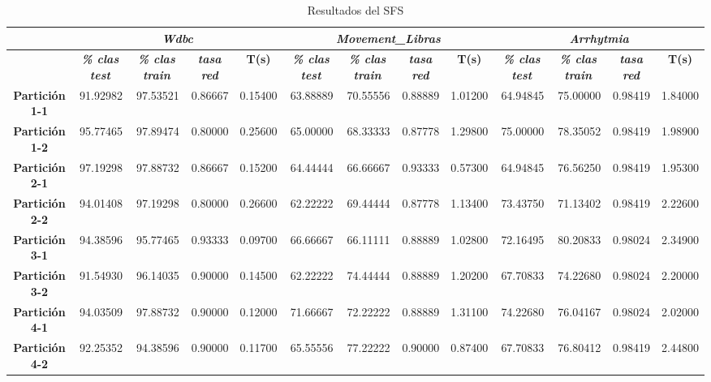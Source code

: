 \documentclass[a4paper,11pt]{article}
\begin{document}
  \begin{table}[H]	
  \caption{Resultados del SFS}
  \begin{adjustbox}{width=1.1\textwidth}
  \begin{tabular}{|c|r|r|r|r|r|r|r|r|r|r|r|r|}
  \hline
  \multicolumn{1}{|l|}{} & \multicolumn{ 4}{c|}{\textbf{\textit{Wdbc}}} & \multicolumn{ 4}{c|}{\textbf{\textit{Movement\_Libras}}} & \multicolumn{ 4}{c|}{\textbf{\textit{Arrhytmia}}} \\ \hline
  \multicolumn{1}{|l|}{} & \multicolumn{1}{c|}{\textbf{\textit{\% clas test}}} & \multicolumn{1}{c|}{\textbf{\textit{\% clas train}}} & \multicolumn{1}{c|}{\textbf{\textit{tasa red}}} & \multicolumn{1}{c|}{\textbf{T(s)}} & \multicolumn{1}{c|}{\textbf{\textit{\% clas test}}} & \multicolumn{1}{c|}{\textbf{\textit{\% clas train}}} & \multicolumn{1}{c|}{\textbf{\textit{tasa red}}} & \multicolumn{1}{c|}{\textbf{T(s)}} & \multicolumn{1}{c|}{\textbf{\textit{\% clas test}}} & \multicolumn{1}{c|}{\textbf{\textit{\% clas train}}} & \multicolumn{1}{c|}{\textbf{\textit{tasa red}}} & \multicolumn{1}{c|}{\textbf{T(s)}} \\ \hline
  \textbf{Partición 1-1} & 91.92982 & 97.53521 & 0.86667 & 0.15400 & 63.88889 & 70.55556 & 0.88889 & 1.01200 & 64.94845 & 75.00000 & 0.98419 & 1.84000 \\ \hline
  \textbf{Partición 1-2} & 95.77465 & 97.89474 & 0.80000 & 0.25600 & 65.00000 & 68.33333 & 0.87778 & 1.29800 & 75.00000 & 78.35052 & 0.98419 & 1.98900 \\ \hline
  \textbf{Partición 2-1} & 97.19298 & 97.88732 & 0.86667 & 0.15200 & 64.44444 & 66.66667 & 0.93333 & 0.57300 & 64.94845 & 76.56250 & 0.98419 & 1.95300 \\ \hline
  \textbf{Partición 2-2} & 94.01408 & 97.19298 & 0.80000 & 0.26600 & 62.22222 & 69.44444 & 0.87778 & 1.13400 & 73.43750 & 71.13402 & 0.98419 & 2.22600 \\ \hline
  \textbf{Partición 3-1} & 94.38596 & 95.77465 & 0.93333 & 0.09700 & 66.66667 & 66.11111 & 0.88889 & 1.02800 & 72.16495 & 80.20833 & 0.98024 & 2.34900 \\ \hline
  \textbf{Partición 3-2} & 91.54930 & 96.14035 & 0.90000 & 0.14500 & 62.22222 & 74.44444 & 0.88889 & 1.20200 & 67.70833 & 74.22680 & 0.98024 & 2.20000 \\ \hline
  \textbf{Partición 4-1} & 94.03509 & 97.88732 & 0.90000 & 0.12000 & 71.66667 & 72.22222 & 0.88889 & 1.31100 & 74.22680 & 76.04167 & 0.98024 & 2.02000 \\ \hline
  \textbf{Partición 4-2} & 92.25352 & 94.38596 & 0.90000 & 0.11700 & 65.55556 & 77.22222 & 0.90000 & 0.87400 & 67.70833 & 76.80412 & 0.98419 & 2.44800 \\ \hline

\end{tabular}
\end{adjustbox}
\end{table}
\end{document}
